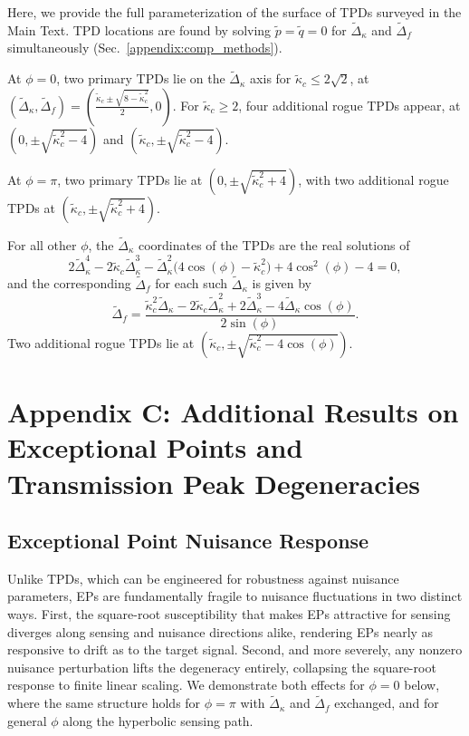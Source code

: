 \documentclass[%
  reprint,
  amsmath,amssymb,
  aps,
  prapplied,
  superscriptaddress,
  longbibliography]{revtex4-2}
\begin{document}
Here, we provide the full parameterization of the surface of TPDs surveyed in the Main Text. TPD locations are found by solving $\tilde{p} = \tilde{q} = 0$ for $\tilde{\Delta}_\kappa$ and $\tilde{\Delta}_f$ simultaneously (Sec.~\ref{appendix:comp_methods}).

At $\phi = 0$, two primary TPDs lie on the $\tilde{\Delta}_\kappa$ axis for $\tilde{\kappa}_c \leq 2\sqrt{2}$, at $(\tilde{\Delta}_\kappa, \tilde{\Delta}_f) = \left(\tfrac{\tilde{\kappa}_c \pm \sqrt{8 - \tilde{\kappa}_c^2}}{2}, 0\right)$. For $\tilde{\kappa}_c \geq 2$, four additional rogue TPDs appear, at $(0, \pm\sqrt{\tilde{\kappa}_c^2 - 4})$ and $(\tilde{\kappa}_c, \pm\sqrt{\tilde{\kappa}_c^2 - 4})$.

At $\phi = \pi$, two primary TPDs lie at $(0, \pm\sqrt{\tilde{\kappa}_c^2 + 4})$, with two additional rogue TPDs at $(\tilde{\kappa}_c, \pm\sqrt{\tilde{\kappa}_c^2 + 4})$.

For all other $\phi$, the $\tilde{\Delta}_\kappa$ coordinates of the TPDs are the real solutions of
{\small
\begin{equation}
2\tilde{\Delta}_\kappa^4 - 2\tilde{\kappa}_c \tilde{\Delta}_\kappa^3 - \tilde{\Delta}_\kappa^2\bigl(4\cos(\phi) - \tilde{\kappa}_c^2\bigr) + 4\cos^2(\phi) - 4 = 0,
\end{equation}
}
and the corresponding $\tilde{\Delta}_f$ for each such $\tilde{\Delta}_\kappa$ is given by
\begin{equation}
\tilde{\Delta}_f = \frac{\tilde{\kappa}_c^2 \tilde{\Delta}_\kappa - 2\tilde{\kappa}_c \tilde{\Delta}_\kappa^2 + 2\tilde{\Delta}_\kappa^3 - 4 \tilde{\Delta}_\kappa\cos(\phi)}{2\sin(\phi)}.
\end{equation}
Two additional rogue TPDs lie at $(\tilde{\kappa}_c, \pm\sqrt{\tilde{\kappa}_c^2 - 4\cos(\phi)})$.

\section{\label{appendix:c} Appendix C: Additional Results on Exceptional Points and Transmission Peak Degeneracies}

\subsection{\label{appendix-sec:ep_hypersensitivity}Exceptional Point Nuisance Response}

Unlike TPDs, which can be engineered for robustness against nuisance parameters, EPs are fundamentally fragile to nuisance fluctuations in two distinct ways. First, the square-root susceptibility that makes EPs attractive for sensing diverges along sensing and nuisance directions alike, rendering EPs nearly as responsive to drift as to the target signal. Second, and more severely, any nonzero nuisance perturbation lifts the degeneracy entirely, collapsing the square-root response to finite linear scaling. We demonstrate both effects for $\phi = 0$ below, where the same structure holds for $\phi = \pi$ with $\tilde{\Delta}_\kappa$ and $\tilde{\Delta}_f$ exchanged, and for general $\phi$ along the hyperbolic sensing path.
\end{document}
